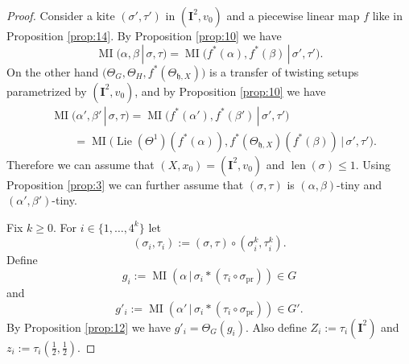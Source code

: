 \documentclass[10pt, a4paper]{amsart}
\theoremstyle{definition}
\numberwithin{equation}{section}
\newcommand{\opn}{\operatorname}
\newcommand{\mfrak}[1]{\mathfrak{#1}}
\newcommand{\mbf}[1]{\mathbf{#1}}
\newcommand{\mrm}[1]{\mathrm{#1}}
\newcommand{\smfrac}[2]{{\textstyle \frac{#1}{#2}}}
\renewcommand{\vert}{\, | \,}
\newcommand{\h}{\mfrak{h}}
\newcommand{\lb}{\linebreak}
\begin{document}
\begin{proof}
Consider a kite $(\sigma', \tau')$ in $(\mbf{I}^2, v_0)$ and a piecewise linear
map $f$ like in Proposition \ref{prop:14}. By Proposition \ref{prop:10} we have
\[ \opn{MI}(\alpha, \beta \vert \sigma, \tau) =
\opn{MI} \bigl( f^*(\alpha) , f^*(\beta) \vert \sigma', \tau' \bigr) . \]
On the other hand
$\bigl( \Theta_G, \Theta_H, f^*(\Theta_{\h, X}) \bigr)$ 
is a transfer of twisting setups \lb parametrized by 
$(\mbf{I}^2, v_0)$, and by Proposition \ref{prop:10} we have
\[ \begin{aligned}
& \opn{MI} \bigl( \alpha', \beta' \vert \sigma, \tau \bigr) =
\opn{MI} \bigl( f^*(\alpha'), f^*(\beta') \vert 
\sigma', \tau' \bigr) \\
& \qquad =
\opn{MI} \bigl( \opn{Lie}(\Theta^1)(f^*(\alpha)), f^*(\Theta_{\h,
X})(f^*(\beta)) \vert \sigma', \tau' \bigr) .
\end{aligned} \]
Therefore we can assume that 
$(X, x_0) = (\mbf{I}^2, v_0)$ and $\opn{len}(\sigma) \leq 1$.
Using Proposition \ref{prop:3} we can further assume that 
$(\sigma, \tau)$ is $(\alpha, \beta)$-tiny and $(\alpha', \beta')$-tiny.

Fix $k \geq 0$. 
For $i \in \{ 1, \ldots, 4^k \}$ let
\[ (\sigma_i, \tau_i) := 
(\sigma, \tau) \circ (\sigma^k_i, \tau^k_i) . \]
Define 
\[ g_i := \opn{MI}(\alpha \vert \sigma_i * (\tau_i \circ \sigma_{\mrm{pr}})) \in
G \]
and
\[ g'_i := \opn{MI}(\alpha' \vert \sigma_i * (\tau_i \circ \sigma_{\mrm{pr}}))
\in G' . \]
By Proposition \ref{prop:12} we have
$g'_i = \Theta_G(g_i)$. 
Also define $Z_i := \tau_i(\mbf{I}^2)$ and 
$z_i := \tau_i(\smfrac{1}{2}, \smfrac{1}{2})$.


\end{proof}
\end{document}
